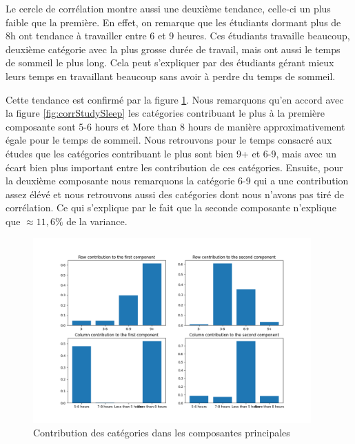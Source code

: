 Le cercle de corrélation montre aussi une deuxième tendance, celle-ci un plus faible que la première.
En effet, on remarque que les étudiants dormant plus de 8h ont tendance à travailler entre 6 et 9 heures.
Ces étudiants travaille beaucoup, deuxième catégorie avec la plus grosse durée de travail, mais ont aussi le temps de sommeil le plus long.
Cela peut s'expliquer par des étudiants gérant mieux leurs temps en travaillant beaucoup sans avoir à perdre du temps de sommeil.


Cette tendance est confirmé par la figure \ref{fig:contribStudySleep}.
Nous remarquons qu'en accord avec la figure \ref{fig:corrStudySleep} les catégories contribuant le plus à la première composante sont 5-6 hours et More than 8 hours de manière approximativement égale pour le temps de sommeil.
Nous retrouvons pour le temps consacré aux études que les catégories contribuant le plus sont bien 9+ et 6-9, mais avec un écart bien plus important entre les contribution de ces catégories.
Ensuite, pour la deuxième composante nous remarquons la catégorie 6-9 qui a une contribution assez élévé et nous retrouvons aussi des catégories dont nous n'avons pas tiré de corrélation.
Ce qui s'explique par le fait que la seconde composante n'explique que $\approx11,6\%$ de la variance.

\begin{figure}[H]
    \begin{center}
      \includegraphics[width=0.95\textwidth]{Images/Study_Sleep_all/RowColumnsContributions.png}
    \end{center}
    \caption{Contribution des catégories dans les composantes principales}
    \label{fig:contribStudySleep}
  \end{figure}




